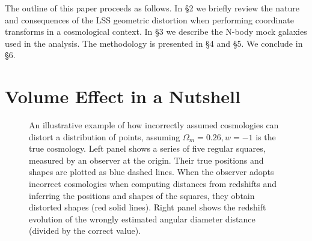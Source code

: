 \documentclass[iop]{emulateapj}
\begin{document}
The outline of this paper proceeds as follows. 
In \S 2 we briefly review the nature and consequences of the LSS geometric distortion when performing coordinate transforms in a cosmological context. 
In \S 3 we describe the N-body mock galaxies used in the analysis.
The methodology is presented in \S 4 and \S 5.
We conclude in \S 6.



\section{Volume Effect in a Nutshell}
\label{sec:Voleffect}

\begin{figure}
   \caption{\label{fig_xyquan}
   An illustrative example of how incorrectly assumed cosmologies can distort a distribution of points,
   assuming $\Omega_m=0.26,w=-1$ is the true cosmology. 
   Left panel shows a series of five regular squares, measured by an observer at the origin.
   Their true positions and shapes are plotted as blue dashed lines.
   When the observer adopts incorrect cosmologies when computing distances from redshifts and inferring the positions and shapes of the squares,
   they obtain distorted shapes (red solid lines).
   Right panel shows the redshift evolution of the wrongly estimated angular diameter distance (divided by the correct value).
   }
\end{figure}
\end{document}

